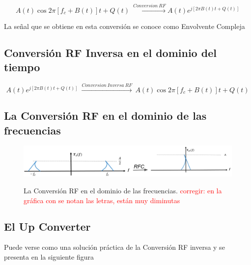 \begin{equation} \label{equ_rfc}
A(t)\cos{ 2 \pi[f_{c}+B(t)]t+Q(t)} \ 
\overset{Conversion \ RF}{\rightarrow}
A(t) e^{j[2\pi B(t)t+Q(t)]}
\end{equation}

La señal que se obtiene en esta conversión se conoce como Envolvente Compleja

\subsection{Conversión RF Inversa  en el dominio del tiempo}

\begin{equation} \label{equ_frc_inv}
A(t)e^{j[2\pi B(t)t+Q(t)]} \
\overset{Conversion \ Inversa \ RF}{\rightarrow} \ A(t)\cos{ 2 \pi[f_{c}+B(t)]t+Q(t) } 
\end{equation}

\subsection{La Conversión RF en el dominio de las frecuencias}

\begin{figure}[h]
	\captionsetup{justification = raggedright, singlelinecheck = false}
	\caption{La Conversión RF en el dominio de las frecuencias. \textcolor{red}{corregir: en la gráfica con se notan las letras, están muy diminutas}} 
	\centering
	\includegraphics[scale=0.25]{Imagenes/rfconversion.jpg}
	\label{fig:RTC}
\end{figure}

\subsection{El Up Converter}
Puede verse como una solución práctica de la Conversión RF inversa y se presenta en la siguiente figura \\

